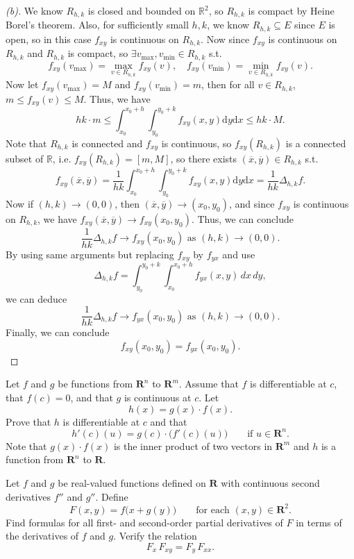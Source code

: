 \begin{proof}[(b)]
    We know \(R_{h, k}\) is closed and bounded on \(\mathbb{R} ^2\), so \(R_{h, k}\) is compact by Heine Borel's theorem. Also, for sufficiently small \(h, k\), we know \(R_{h, k} \subseteq E\) since \(E\) is open, so in this case \(f_{xy}\) is continuous on \(R_{h, k}\). Now since \(f_{xy}\) is continuous on \(R_{h, k}\) and \(R_{h, k}\) is compact, so \(\exists v_{\text{max}}, v_{\text{min}} \in R_{h, k}\) s.t. 
    \[
        f_{xy}(v_{\text{max}}) = \max _{v \in R_{h, k}} f_{xy}(v), \quad f_{xy} (v_{\text{min}}) = \min_{v \in R_{h, k}} f_{xy}(v). 
    \]          
    Now let \(f_{xy}(v_{\text{max}}) = M\) and \(f_{xy} (v_{\text{min}}) = m\), then for all \(v \in R_{h, k}\), \(m \le f_{xy}(v) \le M\). Thus, we have 
    \[
        hk \cdot m \le \int _{x_0}^{x_0 + h} \int _{y_0}^{y_0 + k} f_{xy}(x, y) \mathrm{d} y \mathrm{d} x \le hk \cdot M.  
    \]    
    Note that \(R_{h, k}\) is connected and \(f_{xy}\) is continuous, so \(f_{xy} (R_{h, k})\) is a connected subset of \(\mathbb{R} \), i.e. \(f_{xy} (R_{h, k}) = [m, M]\), so there exists \(\left( \overline{x} , \overline{y}  \right) \in R_{h, k} \) s.t. 
    \[
        f_{xy} \left( \overline{x} , \overline{y}  \right) = \frac{1}{hk} \int _{x_0}^{x_0 + h} \int _{y_0}^{y_0 + k} f_{xy} (x, y) \mathrm{d} y \mathrm{d} x = \frac{1}{hk} \Delta _{h, k} f.   
    \]      
    Now if \((h, k) \to (0, 0)\), then \((\overline{x} , \overline{y} ) \to (x_0, y_0)\), and since \(f_{xy}\) is continuous on \(R_{h, k}\), we have \(f_{xy} \left( \overline{x} , \overline{y}  \right) \to f_{xy}(x_0, y_0) \). Thus, we can conclude 
    \[
        \frac{1}{hk} \Delta _{h, k} f \to f_{xy} (x_0, y_0) \text{ as } (h, k) \to (0, 0). 
    \]
    By using same arguments but replacing \(f_{xy}\) by \(f_{yx}\) and use 
    \[
        \Delta_{h,k} f = \int_{y_0}^{y_0+k}\int_{x_0}^{x_0+h} f_{yx}(x,y)\,dx\,dy,
    \]       
    we can deduce 
    \[
        \frac{1}{hk} \Delta _{h, k} f \to f_{yx} (x_0, y_0) \text{ as } (h, k) \to (0, 0).
    \]
    Finally, we can conclude 
    \[
        f_{xy}(x_0, y_0) = f_{yx} (x_0, y_0).
    \]
\end{proof}

\begin{problem}
    Let $f$ and $g$ be functions from $\mathbf{R}^n$ to $\mathbf{R}^m$. Assume that $f$ is
differentiable at $c$, that $f(c)=0$, and that $g$ is continuous at $c$.
Let
\[
h(x)=g(x)\cdot f(x).
\]
Prove that $h$ is differentiable at $c$ and that
\[
h'(c)(u)=g(c)\cdot\bigl(f'(c)(u)\bigr)
\qquad \text{if } u\in \mathbf{R}^n.
\] Note that $g(x)\cdot f(x)$ is the inner product of two vectors in $\mathbf{R}^m$ and $h$ is a function from
$\mathbf{R}^n$ to $\mathbf{R}$.
\end{problem}

\begin{problem}
    Let $f$ and $g$ be real-valued functions defined on $\mathbf{R}$ with continuous second
derivatives $f''$ and $g''$. Define
\[
F(x,y)=f\bigl(x+g(y)\bigr)
\qquad \text{for each }(x,y)\in \mathbf{R}^2.
\]
Find formulas for all first- and second-order partial derivatives of $F$ in terms of the
derivatives of $f$ and $g$. Verify the relation
\[
F_x\,F_{xy}=F_y\,F_{xx}.
\]
\end{problem}